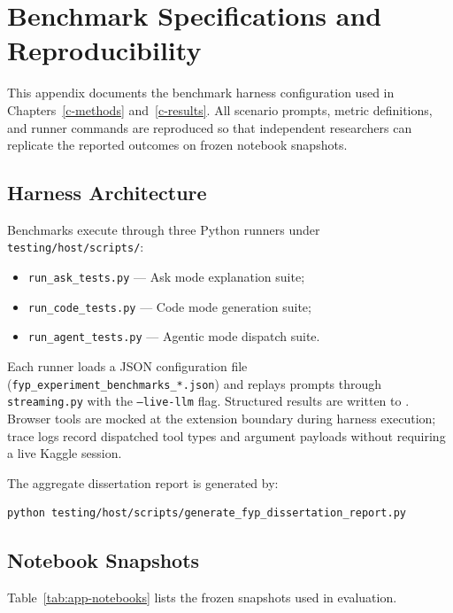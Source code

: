 \appendix
\chapter{Benchmark Specifications and Reproducibility}
\label{app:benchmarks}

This appendix documents the benchmark harness configuration used in Chapters~\ref{c-methods} and~\ref{c-results}. All scenario prompts, metric definitions, and runner commands are reproduced so that independent researchers can replicate the reported outcomes on frozen notebook snapshots.

\section{Harness Architecture}
\label{app:harness}

Benchmarks execute through three Python runners under \texttt{testing/host/scripts/}:

\begin{itemize}
  \item \texttt{run\_ask\_tests.py} --- Ask mode explanation suite;
  \item \texttt{run\_code\_tests.py} --- Code mode generation suite;
  \item \texttt{run\_agent\_tests.py} --- Agentic mode dispatch suite.
\end{itemize}

Each runner loads a JSON configuration file (\texttt{fyp\_experiment\_benchmarks\_*.json}) and replays prompts through \texttt{streaming.py} with the \texttt{--live-llm} flag. Structured results are written to {\ttfamily{}}. Browser tools are mocked at the extension boundary during harness execution; trace logs record dispatched tool types and argument payloads without requiring a live Kaggle session.

The aggregate dissertation report is generated by:

\begin{verbatim}
python testing/host/scripts/generate_fyp_dissertation_report.py
\end{verbatim}

\section{Notebook Snapshots}
\label{app:snapshots}

Table~\ref{tab:app-notebooks} lists the frozen snapshots used in evaluation.

